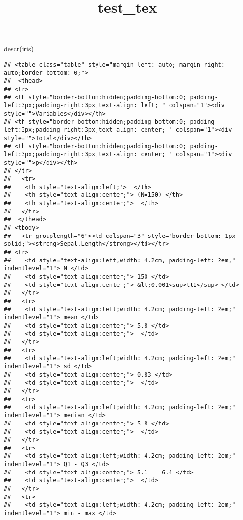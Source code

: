 \documentclass[
]{article}
\title{test\_tex}
\author{}
\date{\vspace{-2.5em}}
\newenvironment{Shaded}{\begin{snugshade}}{\end{snugshade}}
\newcommand{\FunctionTok}[1]{\textcolor[rgb]{0.00,0.00,0.00}{#1}}
\newcommand{\NormalTok}[1]{#1}
\begin{document}
\maketitle

{
\setcounter{tocdepth}{2}
\tableofcontents
}
\begin{Shaded}
\begin{Highlighting}[]
\FunctionTok{descr}\NormalTok{(iris)}
\end{Highlighting}
\end{Shaded}

\begin{verbatim}
## <table class="table" style="margin-left: auto; margin-right: auto;border-bottom: 0;">
##  <thead>
## <tr>
## <th style="border-bottom:hidden;padding-bottom:0; padding-left:3px;padding-right:3px;text-align: left; " colspan="1"><div style="">Variables</div></th>
## <th style="border-bottom:hidden;padding-bottom:0; padding-left:3px;padding-right:3px;text-align: center; " colspan="1"><div style="">Total</div></th>
## <th style="border-bottom:hidden;padding-bottom:0; padding-left:3px;padding-right:3px;text-align: center; " colspan="1"><div style="">p</div></th>
## </tr>
##   <tr>
##    <th style="text-align:left;">  </th>
##    <th style="text-align:center;"> (N=150) </th>
##    <th style="text-align:center;">  </th>
##   </tr>
##  </thead>
## <tbody>
##   <tr grouplength="6"><td colspan="3" style="border-bottom: 1px solid;"><strong>Sepal.Length</strong></td></tr>
## <tr>
##    <td style="text-align:left;width: 4.2cm; padding-left: 2em;" indentlevel="1"> N </td>
##    <td style="text-align:center;"> 150 </td>
##    <td style="text-align:center;"> &lt;0.001<sup>tt1</sup> </td>
##   </tr>
##   <tr>
##    <td style="text-align:left;width: 4.2cm; padding-left: 2em;" indentlevel="1"> mean </td>
##    <td style="text-align:center;"> 5.8 </td>
##    <td style="text-align:center;">  </td>
##   </tr>
##   <tr>
##    <td style="text-align:left;width: 4.2cm; padding-left: 2em;" indentlevel="1"> sd </td>
##    <td style="text-align:center;"> 0.83 </td>
##    <td style="text-align:center;">  </td>
##   </tr>
##   <tr>
##    <td style="text-align:left;width: 4.2cm; padding-left: 2em;" indentlevel="1"> median </td>
##    <td style="text-align:center;"> 5.8 </td>
##    <td style="text-align:center;">  </td>
##   </tr>
##   <tr>
##    <td style="text-align:left;width: 4.2cm; padding-left: 2em;" indentlevel="1"> Q1 - Q3 </td>
##    <td style="text-align:center;"> 5.1 -- 6.4 </td>
##    <td style="text-align:center;">  </td>
##   </tr>
##   <tr>
##    <td style="text-align:left;width: 4.2cm; padding-left: 2em;" indentlevel="1"> min - max </td>

\end{verbatim}
\end{document}
